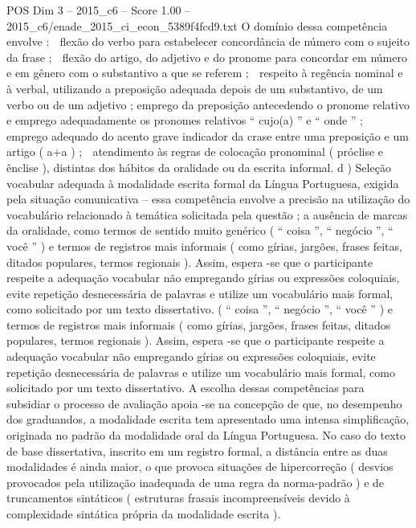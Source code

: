 \begin{textsample}{POS Dim 3 – 2015\_c6 – Score 1.00 – 2015\_c6/enade\_2015\_ci\_econ\_5389f4fcd9.txt}
O domínio dessa competência envolve :  flexão do verbo para estabelecer concordância de número com o sujeito da frase ;  flexão do artigo, do adjetivo e do pronome para concordar em número e em gênero com o substantivo a que se referem ;  respeito à regência nominal e à verbal, utilizando a preposição adequada depois de um substantivo, de um verbo ou de um adjetivo ; emprego da preposição antecedendo o pronome relativo e emprego adequadamente os pronomes relativos “ cujo(a) ” e “ onde ” ;  emprego adequado do acento grave indicador da crase entre uma preposição e um artigo ( a+a ) ;  atendimento às regras de colocação pronominal ( próclise e ênclise ), distintas dos hábitos da oralidade ou da escrita informal. d ) Seleção vocabular adequada à modalidade escrita formal da Língua Portuguesa, exigida pela situação comunicativa – essa competência envolve a precisão na utilização do vocabulário relacionado à temática solicitada pela questão ; a ausência de marcas da oralidade, como termos de sentido muito genérico ( “ coisa ”, “ negócio ”, “ você ” ) e termos de registros mais informais ( como gírias, jargões, frases feitas, ditados populares, termos regionais ).
Assim, espera -se que o participante respeite a adequação vocabular não empregando gírias ou expressões coloquiais, evite repetição desnecessária de palavras e utilize um vocabulário mais formal, como solicitado por um texto dissertativo. ( “ coisa ”, “ negócio ”, “ você ” ) e termos de registros mais informais ( como gírias, jargões, frases feitas, ditados populares, termos regionais ).
Assim, espera -se que o participante respeite a adequação vocabular não empregando gírias ou expressões coloquiais, evite repetição desnecessária de palavras e utilize um vocabulário mais formal, como solicitado por um texto dissertativo.
A escolha dessas competências para subsidiar o processo de avaliação apoia -se na concepção de que, no desempenho dos graduandos, a modalidade escrita tem apresentado uma intensa simplificação, originada no padrão da modalidade oral da Língua Portuguesa.
No caso do texto de base dissertativa, inscrito em um registro formal, a distância entre as duas modalidades é ainda maior, o que provoca situações de hipercorreção ( desvios provocados pela utilização inadequada de uma regra da norma-padrão ) e de truncamentos sintáticos ( estruturas frasais incompreensíveis devido à complexidade sintática própria da modalidade escrita ).

\end{textsample}
